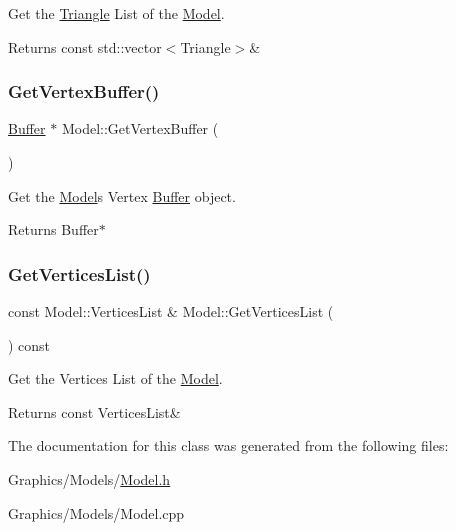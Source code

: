 Get the \hyperlink{structModel_1_1Triangle}{Triangle} List of the \hyperlink{classModel}{Model}. 

\begin{DoxyReturn}{Returns}
const std\+::vector$<$\+Triangle$>$\& 
\end{DoxyReturn}
\mbox{\label{classModel_a48c5723ee018e1fb2875d510b32372e4}} 
\subsubsection{\texorpdfstring{Get\+Vertex\+Buffer()}{GetVertexBuffer()}}
{\footnotesize\ttfamily \hyperlink{classBuffer}{Buffer} $\ast$ Model\+::\+Get\+Vertex\+Buffer (\begin{DoxyParamCaption}{ }\end{DoxyParamCaption})}



Get the \hyperlink{classModel}{Model}\textquotesingle{}s Vertex \hyperlink{classBuffer}{Buffer} object. 

\begin{DoxyReturn}{Returns}
Buffer$\ast$ 
\end{DoxyReturn}
\mbox{\label{classModel_a188605e846853ac0020678922e898015}} 
\subsubsection{\texorpdfstring{Get\+Vertices\+List()}{GetVerticesList()}}
{\footnotesize\ttfamily const Model\+::\+Vertices\+List \& Model\+::\+Get\+Vertices\+List (\begin{DoxyParamCaption}{ }\end{DoxyParamCaption}) const}



Get the Vertices List of the \hyperlink{classModel}{Model}. 

\begin{DoxyReturn}{Returns}
const Vertices\+List\& 
\end{DoxyReturn}


The documentation for this class was generated from the following files\+:\begin{DoxyCompactItemize}
\item 
Graphics/\+Models/\hyperlink{Model_8h}{Model.\+h}\item 
Graphics/\+Models/Model.\+cpp\end{DoxyCompactItemize}
